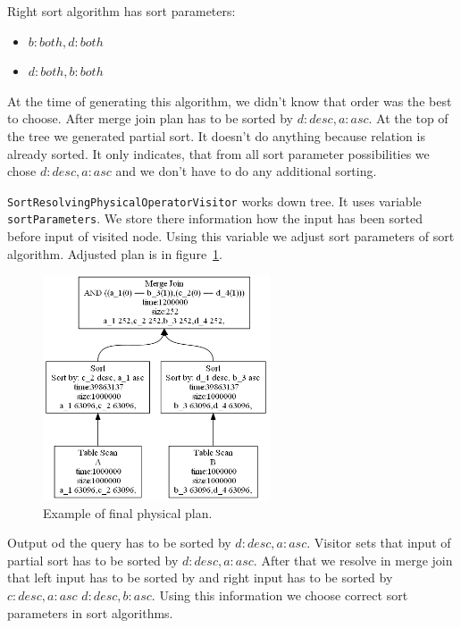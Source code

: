Right sort algorithm has sort parameters:
\begin{itemize}
\item $b:both, d:both$
\item $d:both, b:both$
\end{itemize}

At the time of generating this algorithm, we didn't know that order was the best to choose. After merge join plan has to be sorted by $d:desc,a:asc$. At the top of the tree we generated partial sort. It doesn't do anything because relation is already sorted. It only indicates, that from all sort parameter possibilities we chose $d:desc,a:asc$ and we don't have to do any additional sorting.

\texttt{SortResolvingPhysicalOperatorVisitor} works down tree. It uses variable \texttt{sortParameters}. We store there information how the input has been sorted before input of visited node. Using this variable we adjust sort parameters of sort algorithm. Adjusted plan is in figure~\ref{fig:plansortresolved}.

\begin{figure}[h!]
  \centering
    \includegraphics[width=0.6\textwidth]{plansortresolved}

      \caption{Example of final physical plan.}
          \label{fig:plansortresolved}
\end{figure}

Output od the query has to be sorted by $d:desc,a:asc$. Visitor sets that input of partial sort has to be sorted by $d:desc,a:asc$. After that we resolve in merge join that left input has to be sorted by and right input has to be sorted by $c:desc,a:asc$ $d:desc,b:asc$. Using this information we choose correct sort parameters in sort algorithms. 

